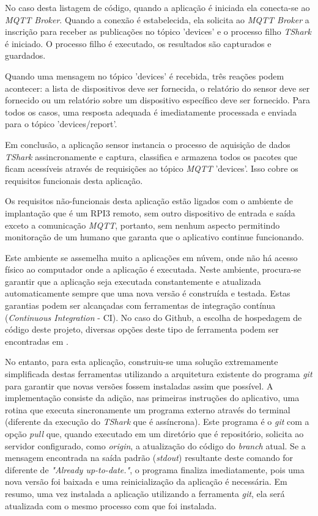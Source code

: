 No caso desta listagem de código, quando a aplicação é iniciada ela conecta-se ao \emph{MQTT Broker}.
Quando a conexão é estabelecida, ela solicita ao \emph{MQTT Broker} a inscrição
para receber as publicações no tópico 'devices' e o processo filho \emph{TShark}
é iniciado. O processo filho é executado, os resultados são capturados e
guardados.

Quando uma mensagem no tópico 'devices' é recebida, três reações podem acontecer:
a lista de dispositivos deve ser fornecida, o relatório do sensor deve ser
fornecido ou um relatório sobre um dispositivo específico deve ser fornecido.
Para todos os casos, uma resposta adequada é imediatamente processada e enviada
para o tópico 'devices/report'.

Em conclusão, a aplicação sensor instancia o processo de aquisição de dados
\emph{TShark} assincronamente e captura, classifica e armazena todos os pacotes
que ficam acessíveis através de requisições ao tópico \emph{MQTT} 'devices'.
Isso cobre os requisitos funcionais desta aplicação.

Os requisitos não-funcionais desta aplicação estão ligados com o ambiente de
implantação que é um RPI3 remoto, sem outro dispositivo de entrada e saída
exceto a comunicação \emph{MQTT}, portanto, sem nenhum aspecto permitindo
monitoração de um humano que garanta que o aplicativo continue funcionando.

Este ambiente se assemelha muito a aplicações em núvem, onde não há acesso
físico ao computador onde a aplicação é executada. Neste ambiente, procura-se
garantir que a aplicação seja executada constantemente e atualizada
automaticamente sempre que uma nova versão é construída e testada. Estas
garantias podem ser alcançadas com ferramentas de integração contínua
(\emph{Continuous Integration} - CI). No caso do Github, a escolha de hospedagem
de código deste projeto, diversas opções deste tipo de ferramenta podem ser
encontradas em \cite{githubdeploy}.

No entanto, para esta aplicação, construiu-se uma solução extremamente
simplificada destas ferramentas utilizando a arquitetura existente do programa
\emph{git} para garantir que novas versões fossem instaladas assim que possível.
A implementação consiste da adição, nas primeiras instruções do aplicativo,
uma rotina que executa sincronamente um programa externo através do terminal
(diferente da execução do \emph{TShark} que é assíncrona). Este programa é
o \emph{git} com a opção \emph{pull} que, quando executado em um diretório que
é repositório, solicita ao servidor configurado, como \emph{origin}, a atualização
do código do \emph{branch} atual. Se a mensagem encontrada na saída padrão
(\emph{stdout}) resultante deste comando for diferente de
\emph{"Already up-to-date."}, o programa finaliza imediatamente, pois uma nova
versão foi baixada e uma reinicialização da aplicação é necessária.
Em resumo, uma vez instalada a aplicação utilizando a ferramenta \emph{git}, ela
será atualizada com o mesmo processo com que foi instalada.

